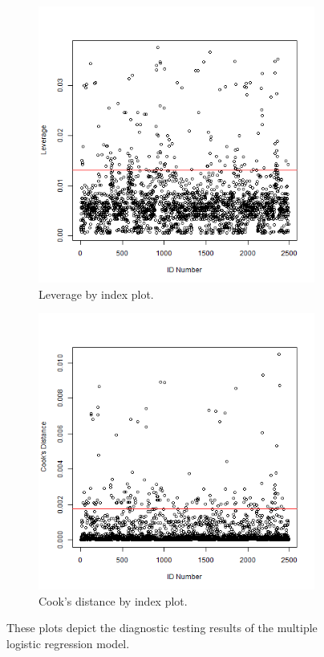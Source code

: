 \graphicspath{{./images/}}
\begin{figure}[!htbp]
    \centering
    \begin{subfigure}[t]{0.48\textwidth}
    \centering
        \includegraphics[width=\linewidth]{Leverage_of_logit.png} 
        \caption{Leverage by index plot.} 
        \label{fig:lev}
    \end{subfigure}%
    \hspace{0.45cm}
    \begin{subfigure}[t]{0.48\textwidth}
    \centering
        \includegraphics[width=\linewidth]{cook_for_logit.png} 
        \caption{Cook's distance by index plot.} \label{fig:cook}
    \end{subfigure}%
    
\caption{These plots depict the diagnostic testing results of the multiple logistic regression model.}
\label{fig:fig1}
\end{figure}